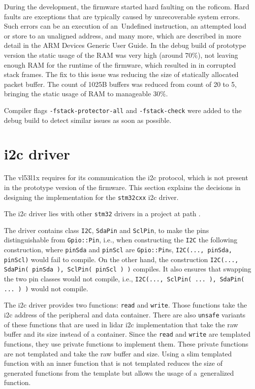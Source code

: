 \documentclass[
  digital,     %
  oneside,     %
  nosansbold,  %
  nocolorbold, %
  nolof,         %
  nolot,         %
]{fithesis4}
\begin{document}
During the development, the firmware started hard faulting on the \acrshort{roficom}. Hard faults
are exceptions that are typically caused by unrecoverable system errors. Such errors can be an
execution of an~Undefined instruction, an attempted load or store to an unaligned address, and many
more, which are described in more detail in the ARM Devices Generic User Guide. In the debug build
of prototype version the static usage of the RAM was very high (around $70\%$), not leaving enough
RAM for the runtime of the firmware, which resulted in in corrupted stack frames. The fix to this
issue was reducing the size of statically allocated packet buffer. The count of 1025B buffers was
reduced from count of 20 to 5, bringing the static usage of RAM to manageable $30\%$.

Compiler flags \lstinline|-fstack-protector-all| and \lstinline|-fstack-check| were added to the
debug build to detect similar issues as soon as possible.

\section[ I2C driver ]{ \acrshort{i2c} driver }

The \gls{vl53l1x} requires for its communication the \acrshort{i2c} protocol, which is not present
in the prototype version of the firmware. This section explains the decisions in designing the
implementation for the \lstinline|stm32cxx| \acrshort{i2c} driver. 

The \acrshort{i2c} driver lies with other \verb|stm32| drivers in a project at path
.

The driver contains class \lstinline|I2C|, \lstinline|SdaPin| and \lstinline|SclPin|, to make the
pins distinguishable from \lstinline|Gpio::Pin|, i.e., when constructing the \lstinline|I2C| the
following construction, where \lstinline|pinSda| and \lstinline|pinScl| are \lstinline|Gpio::Pin|s,
\lstinline|I2C(..., pinSda, pinScl)| would fail to compile. On the other hand, the construction
\lstinline|I2C(..., SdaPin( pinSda ), SclPin( pinScl ) )| compiles. It also ensures that swapping
the two pin classes would not compile, i.e., \lstinline|I2C(..., SclPin( ... ), SdaPin( ... ) )|
would not compile.

The \acrshort{i2c} driver provides two functions: \lstinline|read| and \lstinline|write|. Those
functions take the \acrshort{i2c} address of the peripheral and data container. There are also
\lstinline|unsafe| variants of these functions that are used in \acrshort{lidar} \acrshort{i2c}
implementation that take the raw buffer and its size instead of a container. Since the
\lstinline|read| and \lstinline|write| are templated functions, they use private functions to
implement them. These private functions are not templated and take the raw buffer and size. Using a
slim templated function with an inner function that is not templated reduces the size of generated
functions from the template but allows the usage of a~generalized function.
\end{document}
